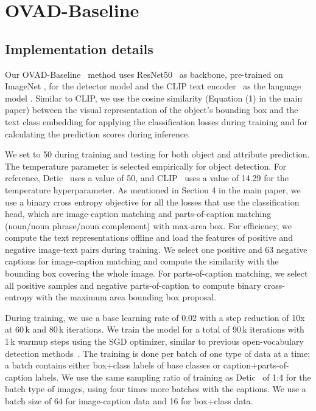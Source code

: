 \documentclass[10pt,twocolumn,letterpaper]{article}
\newcommand{\modelname}{OVAD-Baseline }
\begin{document}
\section{\modelname}
\subsection{Implementation details}
Our \modelname\ method uses ResNet50~\cite{resnet} as backbone, pre-trained on ImageNet \cite{deng2009imagenet}, for the detector model  and the CLIP text encoder~\cite{clip} as the language model . Similar to CLIP, we use the cosine similarity (Equation (1) in the main paper) between the visual representation  of the object's bounding box and the text class embedding  for applying the classification losses during training and for calculating the prediction scores during inference.

We set  to 50 during training and testing for both object and attribute prediction. The temperature parameter is selected empirically for object detection. For reference, Detic~\cite{detic} uses a value of 50, and CLIP~\cite{clip} uses a value of 14.29 for the temperature hyperparameter. As mentioned in Section 4 in the main paper, we use a binary cross entropy objective for all the losses that use the classification head, which are image-caption matching and parts-of-caption matching (noun/noun phrase/noun complement) with max-area box. 
For efficiency, we compute the text representations offline and load the features of positive and negative image-text pairs during training. We select one positive and 63 negative captions for image-caption matching and compute the similarity with the bounding box covering the whole image. For parts-of-caption matching, we select all positive samples  and  negative parts-of-caption to compute binary cross-entropy with the maximum area bounding box proposal.

During training, we use a base learning rate of 0.02 with a step reduction of 10x at 60\,k and 80\,k iterations. We train the model for a total of 90\,k iterations with 1\,k warmup steps using the SGD optimizer, similar to previous open-vocabulary detection methods~\cite{ovr_baseline, detic}. The training is done per batch of one type of data at a time; a batch contains either box+class labels of base classes or caption+parts-of-caption labels. We use the same sampling ratio of training as Detic~\cite{detic} of 1:4 for the batch type of images, using four times more batches with the captions. We use a batch size of 64 for image-caption data and 16 for box+class data. 
\end{document}
